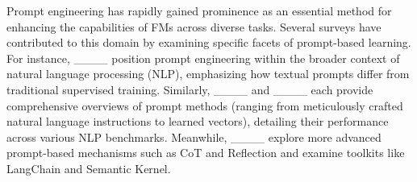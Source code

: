 


Prompt engineering has rapidly gained prominence as an essential method for enhancing the capabilities of FMs across diverse tasks. 
Several surveys have contributed to this domain by examining specific facets of prompt-based learning. 
For instance, ____ position prompt engineering within the broader context of natural language processing (NLP), emphasizing how textual prompts differ from traditional supervised training. 
Similarly, ____ and ____ each provide comprehensive overviews of prompt methods (ranging from meticulously crafted natural language instructions to learned vectors), detailing their performance across various NLP benchmarks. 
Meanwhile, ____ explore more advanced prompt-based mechanisms such as CoT and Reflection and examine toolkits like LangChain and Semantic Kernel.

